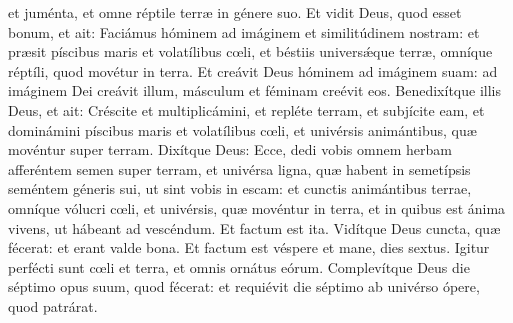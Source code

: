 \begin{paracol}{2}
{et juménta, et omne réptile terræ in génere suo. Et vidit Deus, quod esset bonum, et ait: Faciámus hóminem ad imáginem et similitúdinem nostram: et præsit píscibus maris et volatílibus cœli, et béstiis universǽque terræ, omníque réptíli, quod movétur in terra. Et creávit Deus hóminem ad imáginem suam: ad imáginem Dei creávit illum, másculum et féminam creévit eos. Benedixítque illis Deus, et ait: Créscite et multiplicámini, et repléte terram, et subjícite eam, et dominámini píscibus maris et volatílibus cœli, et univérsis animántibus, quæ movéntur super terram. Dixítque Deus: Ecce, dedi vobis omnem herbam afferéntem semen super terram, et univérsa ligna, quæ habent in semetípsis seméntem géneris sui, ut sint vobis in escam: et cunctis animántibus terrae, omníque vólucri cœli, et univérsis, quæ movéntur in terra, et in quibus est ánima vivens, ut hábeant ad vescéndum. Et factum est ita. Vidítque Deus cuncta, quæ fécerat: et erant valde bona. Et factum est véspere et mane, dies sextus. Igitur perfécti sunt cœli et terra, et omnis ornátus eórum. Complevítque Deus die séptimo opus suum, quod fécerat: et requiévit die séptimo ab univérso ópere, quod patrárat.
}\switchcolumn\portugues{
}
\end{paracol}
